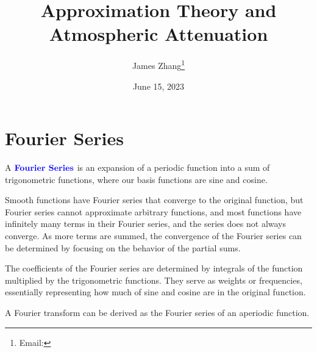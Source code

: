 \documentclass[12pt]{scrartcl}
\begin{document}
\title{Approximation Theory and Atmospheric Attenuation}
\author{James Zhang\thanks{Email: }}
\date{June 15, 2023}




\maketitle
\newpage

\tableofcontents

\newpage

\section{Fourier Series}

\begin{definition}
    A $\textbf{\color{blue} Fourier Series}$ is an expansion of a periodic function into a sum of trigonometric functions, where our basis functions are sine and cosine.
\end{definition}

\begin{note}
    Smooth functions have Fourier series that converge to the original function, but Fourier series cannot approximate arbitrary functions, and most functions have infinitely many terms in their Fourier series, and the series does not always converge. As more terms are summed, the convergence of the Fourier series can be determined by focusing on the behavior of the partial sums.
\end{note}

\begin{note}
    The coefficients of the Fourier series are determined by integrals of the function multiplied by the trigonometric functions.
    They serve as weights or frequencies, essentially representing how much of sine and cosine are in the original function.
\end{note}

\begin{note}
    A Fourier transform can be derived as the Fourier series of an aperiodic function.
\end{note}
\end{document}
